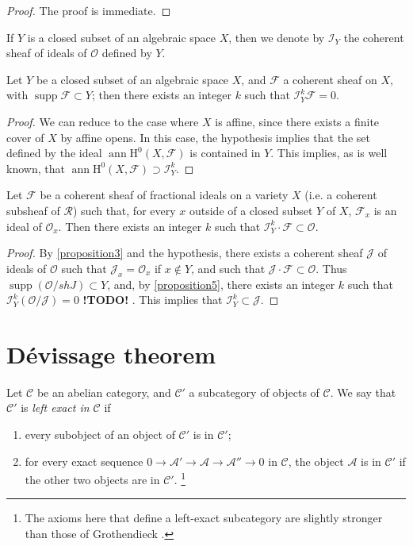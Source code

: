 \documentclass{article}
\theoremstyle{plain}
\newenvironment{proposition}[1]
    {\renewcommand\theinnercustomproposition{#1}\innercustomproposition}
    {\endinnercustomproposition}
\theoremstyle{definition}
\newcommand{\sh}{\mathscr}
\newcommand{\cat}{\mathcal}
\newcommand{\HH}{\mathrm{H}}
\DeclareMathOperator{\ann}{ann}
\DeclareMathOperator{\supp}{supp}
\newcommand{\todo}{\textbf{ !TODO! }}
\newcommand{\oldpage}[1]{\marginpar{\footnotesize$\Big\vert$ \textit{p.~#1}}}
\begin{document}
\begin{proof}
  The proof is immediate.
\end{proof}

\oldpage{4-03}
If $Y$ is a closed subset of an algebraic space $X$, then we denote by $\sh{I}_Y$ the coherent sheaf of ideals of $\sh{O}$ defined by $Y$.

\begin{proposition}{5}
\label{proposition5}
  Let $Y$ be a closed subset of an algebraic space $X$, and $\sh{F}$ a coherent sheaf on $X$, with $\supp\sh{F}\subset Y$;
  then there exists an integer $k$ such that $\sh{I}_Y^k\sh{F}=0$.
\end{proposition}

\begin{proof}
  We can reduce to the case where $X$ is affine, since there exists a finite cover of $X$ by affine opens.
  In this case, the hypothesis implies that the set defined by the ideal $\ann\HH^0(X,\sh{F})$ is contained in $Y$.
  This implies, as is well known, that $\ann\HH^0(X,\sh{F})\supset\sh{I}_Y^k$.
\end{proof}

\begin{proposition}{6}
\label{proposition6}
  Let $\sh{F}$ be a coherent sheaf of fractional ideals on a variety $X$ (i.e. a coherent subsheaf of $\sh{R}$) such that, for every $x$ outside of a closed subset $Y$ of $X$, $\sh{F}_x$ is an ideal of $\sh{O}_x$.
  Then there exists an integer $k$ such that $\sh{I}_Y^k\cdot\sh{F}\subset\sh{O}$.
\end{proposition}

\begin{proof}
  By \cref{proposition3} and the hypothesis, there exists a coherent sheaf $\sh{J}$ of ideals of $\sh{O}$ such that $\sh{J}_x=\sh{O}_x$ if $x\not\in Y$, and such that $\sh{J}\cdot\sh{F}\subset\sh{O}$.
  Thus $\supp(\sh{O}/sh{J})\subset Y$, and, by \cref{proposition5}, there exists an integer $k$ such that $\sh{I}_Y^k(\sh{O}/\sh{J})=0$ \todo.
  This implies that $\sh{I}_Y^k\subset\sh{J}$.
\end{proof}


\section{D\'{e}vissage theorem}
\label{section2}

Let $\cat{C}$ be an abelian category, and $\cat{C}'$ a subcategory of objects of $\cat{C}$.
We say that $\cat{C}'$ is \emph{left exact in $\cat{C}$} if
\begin{enumerate}
  \item every subobject of an object of $\cat{C}'$ is in $\cat{C}'$;
  \item for every exact sequence $0\to\sh{A}'\to\sh{A}\to\sh{A}''\to0$ in $\cat{C}$, the object $\sh{A}$ is in $\cat{C}'$ if the other two objects are in $\cat{C}'$.
  \footnote{The axioms here that define a left-exact subcategory are slightly stronger than those of Grothendieck \cite{4}.}
\end{enumerate}
\end{document}
